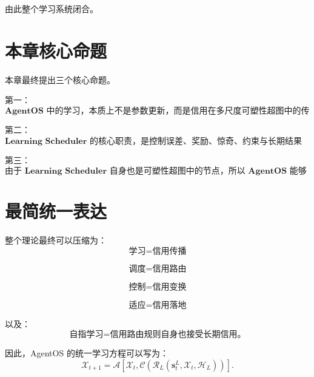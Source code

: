 由此整个学习系统闭合。


\section{本章核心命题}

本章最终提出三个核心命题。

第一：
\begin{equation}
\boxed{
\textbf{
AgentOS 中的学习，本质上不是参数更新，而是信用在多尺度可塑性超图中的传播。
}
}
\end{equation}

第二：
\begin{equation}
\boxed{
\textbf{
Learning Scheduler 的核心职责，是控制误差、奖励、惊奇、约束与长期结果所产生的信用，在不同结构和时间尺度之间如何分配。
}
}
\end{equation}

第三：
\begin{equation}
\boxed{
\textbf{
由于 Learning Scheduler 自身也是可塑性超图中的节点，所以 AgentOS 能够依据过去学习调度的长期结果，反过来修改自己的学习调度策略，从而形成有界的自指学习闭环。
}
}
\end{equation}


\section{最简统一表达}

整个理论最终可以压缩为：
\begin{equation}
\boxed{
\text{学习}
=
\text{信用传播}
}
\end{equation}

\begin{equation}
\boxed{
\text{调度}
=
\text{信用路由}
}
\end{equation}

\begin{equation}
\boxed{
\text{控制}
=
\text{信用变换}
}
\end{equation}

\begin{equation}
\boxed{
\text{适应}
=
\text{信用落地}
}
\end{equation}

以及：
\begin{equation}
\boxed{
\text{自指学习}
=
\text{信用路由规则自身也接受长期信用。}
}
\end{equation}

因此，AgentOS 的统一学习方程可以写为：
\begin{equation}
\boxed{
\mathcal{X}_{t+1}
=
\mathcal{A}
\left[
\mathcal{X}_t,
\mathcal{C}
\left(
\mathcal{R}_L
(
\mathbf{s}_t^L,
\mathcal{X}_t,
\mathcal{H}_L
)
\right)
\right].
}
\end{equation}

